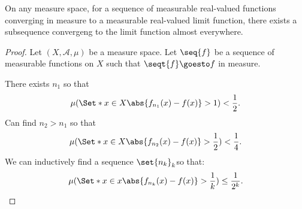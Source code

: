 \begin{proposition}
On any measure space,
for a sequence
of measurable real-valued
functions converging
in measure to a measurable
real-valued limit function,
there exists a subsequence
convergeng to the limit
function almost everywhere.\end{proposition}
\begin{proof}Let $(X, \mathcal{A} , \mu )$ be a measure space.
Let $\seq{f}$ be a sequence of measurable functions on $X$ such that $\seqt{f} \goesto f$ in measure.

There exists $n_1$ so that
    \[
\mu (\Set*{x \in X}{\abs{f_{n_1}(x) - f(x)} > 1}) < \frac{1}{2}.
    \]
Can find $n_2 > n_1$ so that
    \[
\mu (\Set*{x \in X}{\abs{f_{n_2}(x) - f(x)} > \frac{1}{2}}) < \frac{1}{4}.
    \]
We can inductively find a sequence $\set{n_k}_k$so that:
    \[
\mu (\Set*{
x \in x
}{
\abs{f_{n_k}(x) - f(x)} > \frac{1}{k}
}) \leq \frac{1}{2^k}.
    \]
\end{proof}